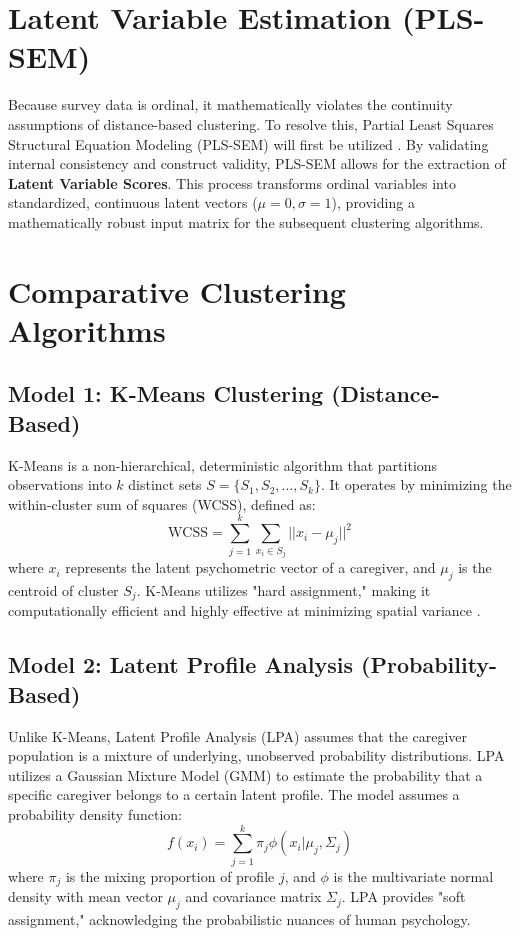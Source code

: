 \section{Latent Variable Estimation (PLS-SEM)}
Because survey data is ordinal, it mathematically violates the continuity assumptions of distance-based clustering. To resolve this, Partial Least Squares Structural Equation Modeling (PLS-SEM) will first be utilized \citep{Hair2021}. By validating internal consistency and construct validity, PLS-SEM allows for the extraction of \textbf{Latent Variable Scores}. This process transforms ordinal variables into standardized, continuous latent vectors ($\mu = 0, \sigma = 1$), providing a mathematically robust input matrix for the subsequent clustering algorithms.

\section{Comparative Clustering Algorithms}

\subsection{Model 1: K-Means Clustering (Distance-Based)}
K-Means is a non-hierarchical, deterministic algorithm that partitions observations into $k$ distinct sets $S = \{S_1, S_2, \dots, S_k\}$. It operates by minimizing the within-cluster sum of squares (WCSS), defined as:
\begin{equation}
    \text{WCSS} = \sum_{j=1}^{k} \sum_{x_i \in S_j} ||x_i - \mu_j||^2
\end{equation}
where $x_i$ represents the latent psychometric vector of a caregiver, and $\mu_j$ is the centroid of cluster $S_j$. K-Means utilizes "hard assignment," making it computationally efficient and highly effective at minimizing spatial variance \citep{Hastie2009}.

\subsection{Model 2: Latent Profile Analysis (Probability-Based)}
Unlike K-Means, Latent Profile Analysis (LPA) assumes that the caregiver population is a mixture of underlying, unobserved probability distributions. LPA utilizes a Gaussian Mixture Model (GMM) to estimate the probability that a specific caregiver belongs to a certain latent profile. The model assumes a probability density function:
\begin{equation}
    f(x_i) = \sum_{j=1}^{k} \pi_j \phi(x_i | \mu_j, \Sigma_j)
\end{equation}
where $\pi_j$ is the mixing proportion of profile $j$, and $\phi$ is the multivariate normal density with mean vector $\mu_j$ and covariance matrix $\Sigma_j$. LPA provides "soft assignment," acknowledging the probabilistic nuances of human psychology.

